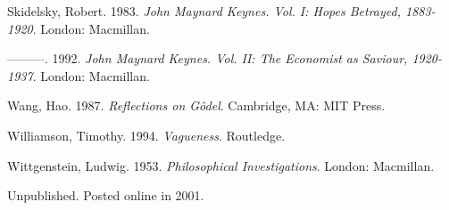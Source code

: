 \documentclass[
  10pt,
  letterpaper,
  DIV=11,
  numbers=noendperiod,
  twoside]{scrartcl}
\newlength{\cslhangindent}
\newenvironment{CSLReferences}[2] %
 {\begin{list}{}{%
  \setlength{\itemindent}{0pt}
  \setlength{\leftmargin}{0pt}
  \setlength{\parsep}{0pt}
  \ifodd #1
   \setlength{\leftmargin}{\cslhangindent}
   \setlength{\itemindent}{-1\cslhangindent}
  \fi
  \setlength{\itemsep}{#2\baselineskip}}}
 {\end{list}}
\begin{document}
\begin{CSLReferences}{1}{0}
Skidelsky, Robert. 1983. \emph{John Maynard Keynes. Vol. I: Hopes
Betrayed, 1883-1920}. London: Macmillan.

---------. 1992. \emph{John Maynard Keynes. Vol. II: The Economist as
Saviour, 1920-1937}. London: Macmillan.

Wang, Hao. 1987. \emph{Reflections on Gôdel}. Cambridge, MA: MIT Press.

Williamson, Timothy. 1994. \emph{{Vagueness}}. Routledge.

Wittgenstein, Ludwig. 1953. \emph{Philosophical Investigations}. London:
Macmillan.

\end{CSLReferences}



\noindent Unpublished. Posted online in 2001.
\end{document}

